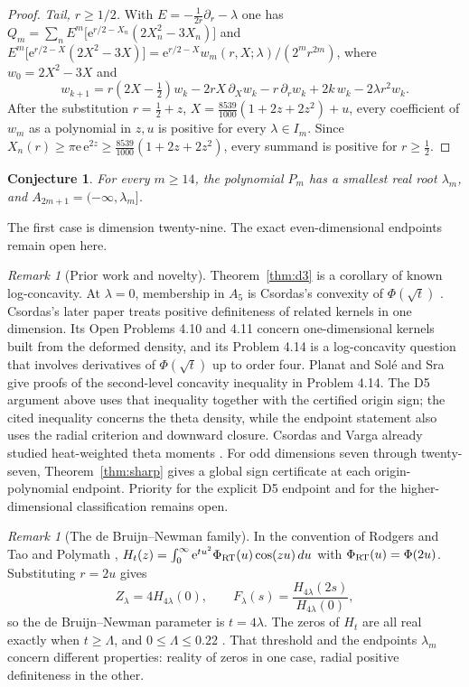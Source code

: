 \documentclass[11pt]{article}
\newtheorem{conjecture}[theorem]{Conjecture}
\theoremstyle{remark}
\newtheorem{remark}[theorem]{Remark}
\newcommand{\ee}{\mathrm{e}}
\begin{document}
\begin{proof}
\emph{Tail, $r\ge1/2$.} With $E=-\tfrac{1}{2r}\partial_r-\lambda$ one has
$Q_m=\sum_n E^m\bigl[\ee^{r/2-X_n}(2X_n^2-3X_n)\bigr]$ and
$E^m\bigl[\ee^{r/2-X}(2X^2-3X)\bigr]=\ee^{r/2-X}w_m(r,X;\lambda)/(2^mr^{2m})$, where $w_0=2X^2-3X$ and
\[
 w_{k+1}=r(2X-\tfrac12)w_k-2rX\,\partial_Xw_k-r\,\partial_rw_k+2k\,w_k-2\lambda r^2w_k .
\]
After the substitution $r=\tfrac12+z$, $X=\tfrac{8539}{1000}(1+2z+2z^2)+u$, every coefficient of
$w_m$ as a polynomial in $z,u$ is positive for every $\lambda\in I_m$. Since
$X_n(r)\ge\pi\ee\,\ee^{2z}\ge\tfrac{8539}{1000}(1+2z+2z^2)$, every summand is positive for $r\ge\tfrac12$.
\end{proof}

\begin{conjecture}\label{conj}
For every $m\ge14$, the polynomial $P_m$ has a smallest real root $\lambda_m$, and
$A_{2m+1}=(-\infty,\lambda_m]$.
\end{conjecture}
The first case is dimension twenty-nine. The exact even-dimensional endpoints remain open here.

\begin{remark}[Prior work and novelty]
Theorem~\ref{thm:d3} is a corollary of known log-concavity. At $\lambda=0$, membership in $A_5$ is
Csordas's convexity of $\Phi(\sqrt{t})$ \cite[Theorem 2.12]{Csordas98}. Csordas's later paper
\cite{Csordas13} treats positive definiteness of related kernels in one dimension. Its Open
Problems 4.10 and 4.11 concern one-dimensional kernels built from the deformed density, and its
Problem 4.14 is a log-concavity question that involves derivatives of $\Phi(\sqrt{t})$ up to order
four. Planat and Sol\'e \cite{PS} and Sra \cite{Sra} give proofs of the
second-level concavity inequality in Problem 4.14. The D5 argument above
uses that inequality together with the certified origin sign; the cited
inequality concerns the theta density, while the endpoint statement also
uses the radial criterion and downward closure. Csordas and Varga already
studied heat-weighted theta moments \cite{CV88}. For odd dimensions seven
through twenty-seven, Theorem~\ref{thm:sharp} gives a global sign
certificate at each origin-polynomial endpoint. Priority for the explicit
D5 endpoint and for the higher-dimensional classification remains open.
\end{remark}

\begin{remark}[The de Bruijn--Newman family]
In the convention of Rodgers and Tao \cite{RT} and Polymath \cite{Polymath},
$H_t(z)=\int_0^\infty \ee^{tu^2}\Phi_{\rm RT}(u)\cos(zu)\,du$ with $\Phi_{\rm RT}(u)=\Phi(2u)$.
Substituting $r=2u$ gives
\[
 Z_\lambda=4H_{4\lambda}(0),\qquad F_\lambda(s)=\frac{H_{4\lambda}(2s)}{H_{4\lambda}(0)},
\]
so the de Bruijn--Newman parameter is $t=4\lambda$. The zeros of $H_t$ are all real exactly when
$t\ge\Lambda$, and $0\le\Lambda\le0.22$ \cite{RT,Polymath}. That threshold and the endpoints
$\lambda_m$ concern different properties: reality of zeros in one case, radial positive
definiteness in the other.
\end{remark}
\end{document}

